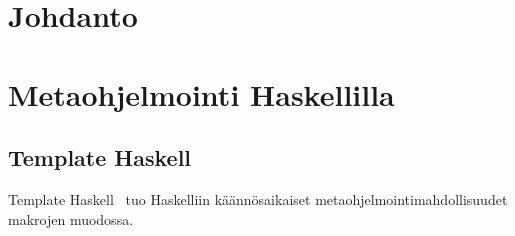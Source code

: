 \section{Johdanto}

\section{Metaohjelmointi Haskellilla}
\subsection{Template Haskell}

Template Haskell~\cite{ThPaper} tuo Haskelliin käännösaikaiset metaohjelmointimahdollisuudet makrojen muodossa.
